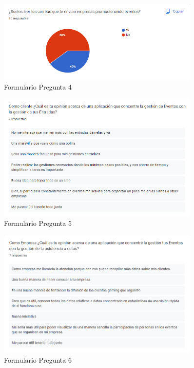 \begin{figure}[h]
    \centering
    \includegraphics[width=0.9\textwidth]{Form4.png} 
    \caption{Formulario Pregunta 4}
    \label{fig:form4}
\end{figure}
\begin{figure}[h]
    \centering
    \includegraphics[width=0.9\textwidth]{Form5.png} 
    \caption{Formulario Pregunta 5}
    \label{fig:form5}
\end{figure}
\begin{figure}[h]
    \centering
    \includegraphics[width=0.9\textwidth]{Form6.png} 
    \caption{Formulario Pregunta 6}
    \label{fig:form6}
\end{figure}
